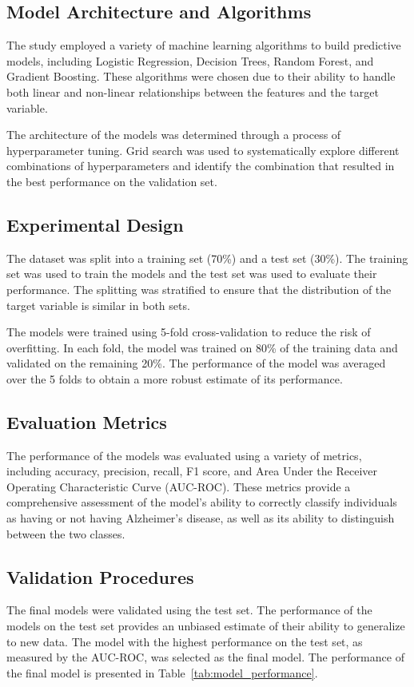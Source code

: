 \documentclass[conference]{IEEEtran}
\begin{document}
\subsection{Model Architecture and Algorithms}
The study employed a variety of machine learning algorithms to build predictive models, including Logistic Regression, Decision Trees, Random Forest, and Gradient Boosting. These algorithms were chosen due to their ability to handle both linear and non-linear relationships between the features and the target variable. 

The architecture of the models was determined through a process of hyperparameter tuning. Grid search was used to systematically explore different combinations of hyperparameters and identify the combination that resulted in the best performance on the validation set.

\subsection{Experimental Design}
The dataset was split into a training set (70\%) and a test set (30\%). The training set was used to train the models and the test set was used to evaluate their performance. The splitting was stratified to ensure that the distribution of the target variable is similar in both sets.

The models were trained using 5-fold cross-validation to reduce the risk of overfitting. In each fold, the model was trained on 80\% of the training data and validated on the remaining 20\%. The performance of the model was averaged over the 5 folds to obtain a more robust estimate of its performance.

\subsection{Evaluation Metrics}
The performance of the models was evaluated using a variety of metrics, including accuracy, precision, recall, F1 score, and Area Under the Receiver Operating Characteristic Curve (AUC-ROC). These metrics provide a comprehensive assessment of the model's ability to correctly classify individuals as having or not having Alzheimer's disease, as well as its ability to distinguish between the two classes.

\subsection{Validation Procedures}
The final models were validated using the test set. The performance of the models on the test set provides an unbiased estimate of their ability to generalize to new data. The model with the highest performance on the test set, as measured by the AUC-ROC, was selected as the final model. The performance of the final model is presented in Table~\ref{tab:model_performance}.
\end{document}
